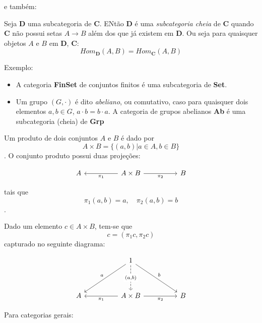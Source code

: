 \documentclass[../main.tex]{subfiles}
\begin{document}
e também:

\begin{definition}
    Seja $\textbf{D}$ uma subcategoria de $\textbf{C}$. ENtão $\textbf{D}$ é uma \emph{subcategoria cheia} de \textbf{C} quando \textbf{C} não possui setas $A \to B$ além dos que já existem em $\textbf{D}$. Ou seja para quaisquer objetos $A$ e $B$ em $\textbf{D}$, $\textbf{C}$: $$Hom_{\textbf{D}}(A, B) = Hom_{\textbf{C}}(A, B)$$
\end{definition}

Exemplo:

\begin{itemize}
    \item A categoria \textbf{FinSet} de conjuntos finitos é uma subcategoria de \textbf{Set}.
    \item Um grupo $(G, \cdot)$ é dito \emph{abeliano}, ou comutativo, caso para quaisquer dois elementos $a, b \in G$, $a \cdot b = b \cdot a$. A categoria de grupos abelianos \textbf{Ab} é uma subcategoria (cheia) de \textbf{Grp}
\end{itemize}

Um produto de dois conjuntos $A$ e $B$ é dado por $$A \times B = \{ (a, b) | a \in A, b \in B \}$$. O conjunto produto possui duas projeções:

\[\begin{tikzcd}
	A && {A \times B} && B
	\arrow["{\pi_1}", from=1-3, to=1-1]
	\arrow["{\pi_2}"', from=1-3, to=1-5]
\end{tikzcd}\]

tais que $$\pi_1(a,b) = a, \quad \pi_2(a, b) = b$$.

Dado um elemento $c \in A \times B$, tem-se que $$c = (\pi_1 c, \pi_2 c)$$ capturado no seguinte diagrama:

\[\begin{tikzcd}
	&& 1 \\
	\\
	A && {A \times B} && B
	\arrow["a"', from=1-3, to=3-1]
	\arrow["{(a, b)}"{description}, dashed, from=1-3, to=3-3]
	\arrow["b", from=1-3, to=3-5]
	\arrow["{\pi_1}", from=3-3, to=3-1]
	\arrow["{\pi_2}"', from=3-3, to=3-5]
\end{tikzcd}\]

Para categorias gerais:
\end{document}
